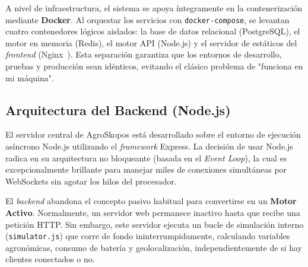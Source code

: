 
A nivel de infraestructura, el sistema se apoya íntegramente en la contenerización mediante \textbf{Docker}. Al orquestar los servicios con \texttt{docker-compose}, se levantan cuatro contenedores lógicos aislados: la base de datos relacional (PostgreSQL), el motor en memoria (Redis), el motor API (Node.js) y el servidor de estáticos del \textit{frontend} (Nginx~\cite{nginx}). Esta separación garantiza que los entornos de desarrollo, pruebas y producción sean idénticos, evitando el clásico problema de "funciona en mi máquina".


\subsection{Arquitectura del Backend (Node.js)}
El servidor central de AgroSkopos está desarrollado sobre el entorno de ejecución asíncrono Node.js utilizando el \textit{framework} Express. La decisión de usar Node.js radica en su arquitectura no bloqueante (basada en el \textit{Event Loop}), la cual es excepcionalmente brillante para manejar miles de conexiones simultáneas por WebSockets sin agotar los hilos del procesador.

El \textit{backend} abandona el concepto pasivo habitual para convertirse en un \textbf{Motor Activo}. Normalmente, un servidor web permanece inactivo hasta que recibe una petición HTTP. Sin embargo, este servidor ejecuta un bucle de simulación interno (\texttt{simulator.js}) que corre de fondo ininterrumpidamente, calculando variables agronómicas, consumo de batería y geolocalización, independientemente de si hay clientes conectados o no.

